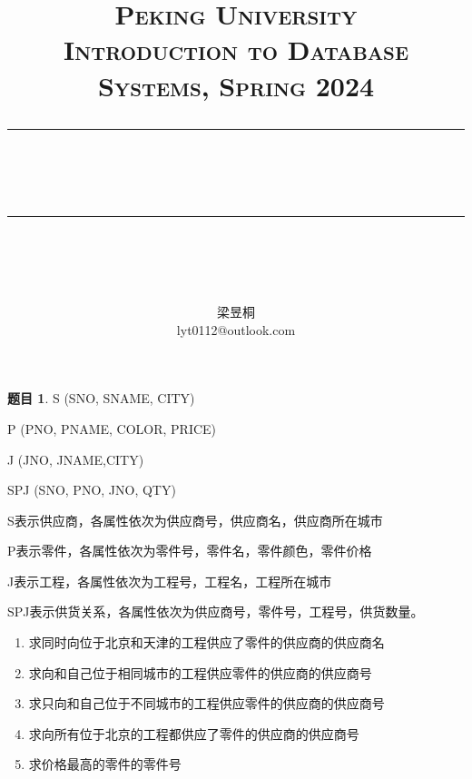 \documentclass[12pt]{article} %
\theoremstyle{definition}
\newtheorem{problem}{题目}
\newcommand{\horrule}[1]{\rule[0.5ex]{\linewidth}{#1}} 	%
\begin{document}
\title{
{\normalfont\normalsize\textsc{
Peking University\\
Introduction to Database Systems, Spring 2024 \\[25pt]}}
\horrule{0.5pt}\\
\horrule{1.8pt}\\[20pt]
}
\author{梁昱桐\\lyt0112@outlook.com}

\begin{titlepage}
\maketitle
\vspace{30pt}


\thispagestyle{empty}
\end{titlepage}


\newpage
\setcounter{page}{1}

\begin{problem}
S (SNO, SNAME, CITY)

P (PNO, PNAME, COLOR, PRICE)

J (JNO, JNAME,CITY)

SPJ (SNO, PNO, JNO, QTY)

S表示供应商，各属性依次为供应商号，供应商名，供应商所在城市

P表示零件，各属性依次为零件号，零件名，零件颜色，零件价格

J表示工程，各属性依次为工程号，工程名，工程所在城市

SPJ表示供货关系，各属性依次为供应商号，零件号，工程号，供货数量。

\begin{enumerate}
  \item 求同时向位于北京和天津的工程供应了零件的供应商的供应商名
  \item 求向和自己位于相同城市的工程供应零件的供应商的供应商号
  \item 求只向和自己位于不同城市的工程供应零件的供应商的供应商号
  \item 求向所有位于北京的工程都供应了零件的供应商的供应商号
  \item 求价格最高的零件的零件号
\end{enumerate}

\end{problem}
\end{document}
